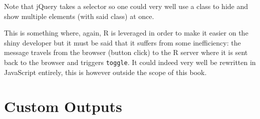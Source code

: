 \documentclass[
]{krantz}
\makeatletter
\newenvironment{Shaded}{\begin{snugshade}}{\end{snugshade}}
\newcommand{\ControlFlowTok}[1]{\textcolor[rgb]{0.27,0.27,0.27}{\textbf{#1}}}
\newcommand{\DataTypeTok}[1]{\textcolor[rgb]{0.27,0.27,0.27}{#1}}
\newcommand{\KeywordTok}[1]{\textcolor[rgb]{0.27,0.27,0.27}{\textbf{#1}}}
\newcommand{\NormalTok}[1]{#1}
\newcommand{\OperatorTok}[1]{\textcolor[rgb]{0.43,0.43,0.43}{\textbf{#1}}}
\newcommand{\StringTok}[1]{\textcolor[rgb]{0.5,0.5,0.5}{#1}}
\newenvironment{kframe}{%
\medskip{}
\setlength{\fboxsep}{.8em}
 \def\at@end@of@kframe{}%
 \ifinner\ifhmode%
  \def\at@end@of@kframe{\end{minipage}}%
  \begin{minipage}{\columnwidth}%
 \fi\fi%
 \def\FrameCommand##1{\hskip\@totalleftmargin \hskip-\fboxsep
 \colorbox{shadecolor}{##1}\hskip-\fboxsep
     \hskip-\linewidth \hskip-\@totalleftmargin \hskip\columnwidth}%
 \MakeFramed {\advance\hsize-\width
   \@totalleftmargin\z@ \linewidth\hsize
   \@setminipage}}%
 {\par\unskip\endMakeFramed%
 \at@end@of@kframe}
\renewenvironment{Shaded}{\begin{kframe}}{\end{kframe}}
\makeatother
\begin{document}
Note that jQuery takes a selector so one could very well use a class to hide and show multiple elements (with said class) at once.

\begin{Shaded}
\end{Shaded}

This is something where, again, R is leveraged in order to make it easier on the shiny developer but it must be said that it suffers from some inefficiency: the message travels from the browser (button click) to the R server where it is sent back to the browser and triggers \texttt{toggle}. It could indeed very well be rewritten in JavaScript entirely, this is however outside the scope of this book.

\hypertarget{custom-outputs}{%
\chapter{Custom Outputs}\label{custom-outputs}}
\end{document}
